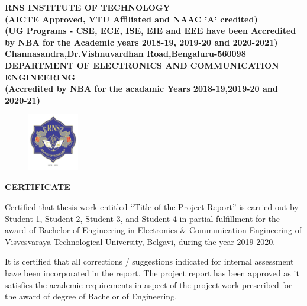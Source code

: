 %
\setlength{\toptafiddle}{1in}
\setlength{\bottafiddle}{1in}
\vspace*{-0.5in}
\enlargethispage{\bottafiddle}
\thispagestyle{empty}


\begin{center}
\small\textbf{	RNS INSTITUTE OF TECHNOLOGY\\
(AICTE Approved, VTU Affiliated and NAAC 'A' credited)\\
(UG Programs - CSE, ECE, ISE, EIE and EEE have been Accredited by NBA for the Academic years 2018-19, 2019-20 and 2020-2021)\\
Channasandra,Dr.Vishnuvardhan Road,Bengaluru-560098\\
\vspace{0.3cm}
DEPARTMENT OF ELECTRONICS AND COMMUNICATION ENGINEERING\\
(Accredited by NBA for the acadamic Years 2018-19,2019-20 and 2020-21)
}
\end{center}

\begin{center}
\begin{figure}[h]
\centering
\includegraphics[height=2.5cm]{images/rns1.jpg}
\end{figure}
\Large{\textbf{CERTIFICATE}}
\end{center}

Certified that thesis work entitled ``Title of the Project Report'' is carried out by Student-1, Student-2, Student-3, and Student-4 in partial fulfillment for the award of Bachelor of Engineering in Electronics \& Communication Engineering of Visvesvaraya Technological University, Belgavi, during the year 2019-2020. 


It is certified that all corrections / suggestions indicated for internal assessment have been incorporated in the report. The project report has been approved as it satisfies the academic requirements in aspect of the project work prescribed for the award of degree of Bachelor of Engineering.


